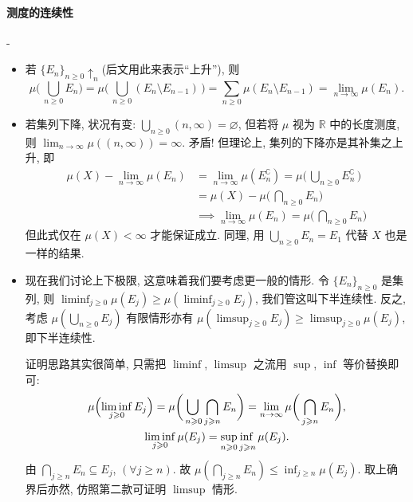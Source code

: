 \paragraph{测度的连续性}\mbox{}\kern-\ccwd\enote
\begin{itemize}
    \item 若 $\{E_n\}_{n\geqslant 0}\uparrow_n$(后文用此来表示``上升''), 则
          \[
              \mu \biggl(\, \bigcup_{n\geqslant 0}E_n \biggr) = \mu  \biggl(\, \bigcup_{n\geqslant 0}(E_n\setminus E_{n-1})\, \biggr) = \sum_{n\geqslant 0} \mu (E_n\setminus E_{n-1}) = \lim_{n \to \infty} \mu (E_n).
          \]
    \item 若集列下降, 状况有变: $\bigcup_{n\geqslant 0}(n,\infty) = \varnothing$, 但若将 $\mu $ 视为 $\mathbb R$ 中的长度测度, 则 $\lim_{n \to \infty} \mu((n,\infty))=\infty $. 矛盾! 但理论上, 集列的下降亦是其补集之上升, 即 \label{测度的连续性:集列下降}
          \[
              \begin{aligned}
                  \mu (X)-\lim_{n \to \infty} \mu (E_n) & = \lim_{n \to \infty} \mu (E_n^\complement)= \mu \biggl(\,\bigcup_{n\geqslant 0}E_n^\complement\,\biggr) \\
                                                        & = \mu(X) -  \mu \biggl(\,\bigcap_{n\geqslant 0}E_n\biggr)                                                \\
                                                        & \!\implies \lim_{n \to \infty}  \mu (E_n)=\mu \biggl(\,\bigcap_{n\geqslant 0}E_n\biggr)
              \end{aligned}
          \]
          但此式仅在 $\mu (X)<\infty$ 才能保证成立. 同理, 用 $\bigcup_{n\geqslant 0}E_n=E_1$ 代替 $X$ 也是一样的结果.
    \item 现在我们讨论上下极限, 这意味着我们要考虑更一般的情形. 令 $\{E_n\}_{n\geqslant 0}$ 是集列, 则 $\liminf_{j\geqslant 0} \mu (E_j)\geqslant \mu (\liminf_{j\geqslant 0} E_j)$, 我们管这叫下半连续性. 反之, 考虑 $\mu (\bigcup_{n\geqslant 0}E_j)$ 有限情形亦有 $\mu (\limsup_{j\geqslant 0} E_j)  \geqslant \limsup _{j\geqslant 0}\mu (E_j)$, 即下半连续性.

          证明思路其实很简单, 只需把 $\liminf$, $\limsup$ 之流用 $\sup$, $\inf$ 等价替换即可:
          \begin{gather*}
              \mu \Bigl(\liminf_{j\geqslant 0} E_j\Bigr)=\mu \biggl(\,\adjustlimits\bigcup_{n\geqslant 0}\bigcap_{j\geqslant n}E_n\biggr) = \lim_{n \to \infty}\mu \biggl(\,\bigcap_{j\geqslant n}E_n\biggr), \\
              \liminf_{j\geqslant 0}\mu(E_j) = \adjustlimits\sup_{n\geqslant 0}\inf_{j\geqslant n} \mu(E_j).
          \end{gather*}
          由 $\bigcap_{j\geqslant n}E_n\subseteq E_j$, $(\forall j\geqslant n)$. 故 $\mu (\bigcap_{j\geqslant n}E_n)\leqslant \inf_{j\geqslant n}\mu(E_j)$. 取上确界后亦然, 仿照第二款可证明 $\limsup$ 情形.
\end{itemize}
